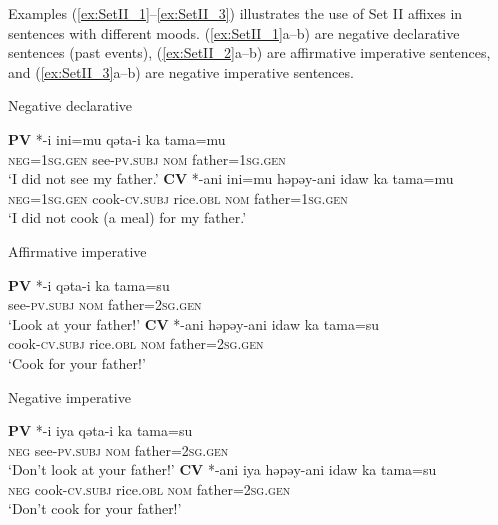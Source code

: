 Examples (\ref{ex:SetII_1}--\ref{ex:SetII_3}) illustrates the use of Set II affixes in sentences with different moods. (\ref{ex:SetII_1}a--b) are negative declarative sentences (past events), (\ref{ex:SetII_2}a--b) are affirmative imperative sentences, and (\ref{ex:SetII_3}a--b) are negative imperative sentences.

\begin{exe}
\ex Negative declarative \label{ex:SetII_1}
    \begin{xlist}
    \ex \textbf{PV} *-i
    \gll *ini=mu qəta-i ka tama=mu\\
    \textsc{neg}=\textsc{1sg.gen} see-\textsc{pv.subj} \textsc{nom} father=\textsc{1sg.gen}\\
    \glt `I did not see my father.'
    \ex \textbf{CV} *-ani
    \gll *ini=mu həpəy-ani idaw ka tama=mu\\
    \textsc{neg}=\textsc{1sg.gen} cook-\textsc{cv.subj} rice.\textsc{obl} \textsc{nom} father=\textsc{1sg.gen}\\
    \glt `I did not cook (a meal) for my father.'
    \end{xlist}
\ex Affirmative imperative \label{ex:SetII_2}
    \begin{xlist}
    \ex \textbf{PV} *-i
    \gll *qəta-i ka tama=su\\
    see-\textsc{pv.subj} \textsc{nom} father=\textsc{2sg.gen}\\
    \glt `Look at your father!'
    \ex \textbf{CV} *-ani
    \gll *həpəy-ani idaw ka tama=su\\
    cook-\textsc{cv.subj} rice.\textsc{obl} \textsc{nom} father=\textsc{2sg.gen}\\
    \glt `Cook for your father!'
    \end{xlist}
\ex Negative imperative \label{ex:SetII_3}
    \begin{xlist}
    \ex \textbf{PV} *-i
    \gll *iya qəta-i ka tama=su\\
    \textsc{neg} see-\textsc{pv.subj} \textsc{nom} father=\textsc{2sg.gen}\\
    \glt `Don't look at your father!'
    \ex \textbf{CV} *-ani
    \gll *iya həpəy-ani idaw ka tama=su\\
    \textsc{neg} cook-\textsc{cv.subj} rice.\textsc{obl} \textsc{nom} father=\textsc{2sg.gen}\\
    \glt `Don't cook for your father!'
    \end{xlist}
\end{exe}


